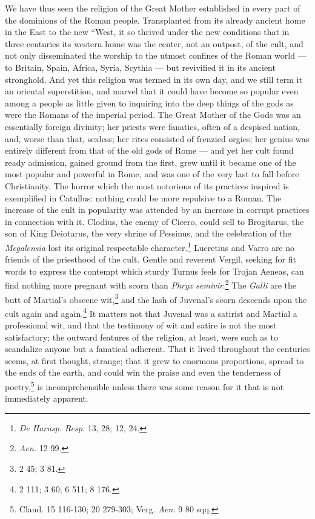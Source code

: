 \documentclass[a4paper, 11pt, oneside, polutonikogreek, french]{article}
\begin{document}
We have thus seen the religion of the Great Mother established in every part of the dominions of the Roman people. Transplanted from its already ancient home in the East to the new ``West, it so thrived under the new conditions that in three centuries its western home was the center, not an outpost, of the cult, and not only disseminated the worship to the utmost confines of the Roman world --- to Britain, Spain, Africa, Syria, Scythia --- but revivified it in its ancient stronghold. And yet this religion was termed in its own day, and we still term it an oriental superstition, and marvel that it could have become so popular even among a people as little given to inquiring into the deep things of the gods as were the Romans of the imperial period. The Great Mother of the Gods was an essentially foreign divinity; her priests were fanatics, often of a despised nation, and, worse than that, sexless; her rites consisted of frenzied orgies; her genius was entirely different from that of the old gods of Rome --- and yet her cult found ready admission, gained ground from the first, grew until it became one of the most popular and powerful in Rome, and was one of the very last to fall before Christianity. The horror which the most notorious of its practices inspired is exemplified in Catullus: nothing could be more repulsive to a Roman. The increase of the cult in popularity was attended by an increase in corrupt practices in connection with it. Clodius, the enemy of Cicero, could sell to Brogitarus, the son of King Deiotarus, the very shrine of Pessinus, and the celebration of the \emph{Megalensia} lost its original respectable character.\footnote{\emph{De Harusp. Resp.} 13, 28; 12, 24.} Lucretius and Varro are no friends of the priesthood of the cult. Gentle and reverent Vergil, seeking for fit words to express the contempt which sturdy Turnus feels for Trojan Aeneas, can find nothing more pregnant with scorn than \emph{Phryx semivir}.\footnote{\emph{Aen.} 12 99.} The \emph{Galli} are the butt of Martial's obscene wit,\footnote{2 45; 3 81.} and the lash of Juvenal's scorn descends upon the cult again and again.\footnote{2 111; 3 60; 6 511; 8 176.} It matters not that Juvenal was a satirist and Martial a professional wit, and that the testimony of wit and satire is not the most satisfactory; the outward features of the religion, at least, were such as to scandalize anyone but a fanatical adherent. That it lived throughout the centuries seems, at first thought, strange; that it grew to enormous proportions, spread to the ends of the earth, and could win the praise and even the tenderness of poetry,\footnote{Claud. 15 116-130; 20 279-303; Verg. \emph{Aen.} 9 80 sqq.} is incomprehensible unless there was some reason for it that is not immediately apparent.
\end{document}
